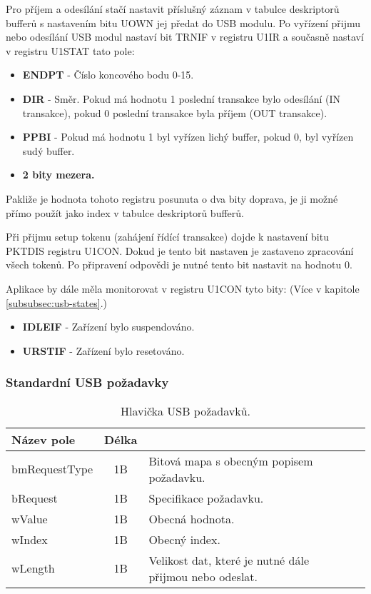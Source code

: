 Pro příjem a odesílání stačí nastavit příslušný záznam v tabulce deskriptorů bufferů s nastavením bitu UOWN jej předat do USB modulu. Po vyřízení přijmu nebo odesílání USB modul nastaví bit TRNIF v registru U1IR a současně nastaví v registru U1STAT tato pole:
\begin{itemize}
\item \textbf{ENDPT} - Číslo koncového bodu 0-15.
\item \textbf{DIR} - Směr. Pokud má hodnotu 1 poslední transakce bylo odesílání (IN transakce), pokud 0 poslední transakce byla příjem (OUT transakce).
\item \textbf{PPBI} - Pokud má hodnotu 1 byl vyřízen lichý buffer, pokud 0, byl vyřízen sudý buffer.
\item \textbf{2 bity mezera.}
\end{itemize}

Pakliže je hodnota tohoto registru posunuta o dva bity doprava, je ji možné přímo použít jako index v tabulce deskriptorů bufferů.

Při přijmu setup tokenu (zahájení řídící transakce) dojde k nastavení bitu PKTDIS registru U1CON. Dokud je tento bit nastaven je zastaveno zpracování všech tokenů. Po připravení odpovědi je nutné tento bit nastavit na hodnotu 0.

Aplikace by dále měla monitorovat v registru U1CON tyto bity: (Více v kapitole \ref{subsubsec:usb-states}.)

\begin{itemize}
\item \textbf{IDLEIF} - Zařízení bylo suspendováno.
\item \textbf{URSTIF} - Zařízení bylo resetováno.
\end{itemize}



\subsubsection{Standardní USB požadavky}

\begin{table}[ht!]
\begin{center}
\begin{tabular}{|l|c|l|l|}
\hline 
Název pole & Délka &  \\ 
\hline
bmRequestType & 1B & Bitová mapa s obecným popisem požadavku.\\
\hline
bRequest & 1B & Specifikace požadavku. \\
\hline
wValue & 1B & Obecná hodnota. \\
\hline
wIndex & 1B & Obecný index.\\
\hline
wLength & 1B & Velikost dat, které je nutné dále přijmou nebo odeslat. \\ 
\hline
\end{tabular} 
\end{center}
\caption{Hlavička USB požadavků.}
\label{tab:usb-stdreq-hdr} 
\end{table}

